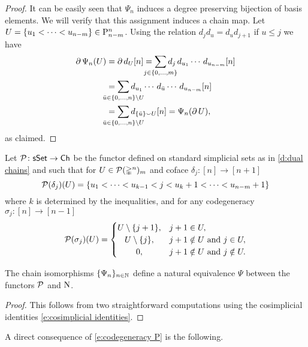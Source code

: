\begin{proof}
	It can be easily seen that $\Psi_n$ induces a degree preserving bijection of basis elements.
	We will verify that this assignment induces a chain map.
	Let $U = \{u_1 < \cdots < u_{n-m}\} \in \mathrm{P}_{n-m}^n$.
	Using the relation $d_jd_u = d_ud_{j+1}$ if $u \leq j$ we have
	\begin{align*}
	\bd \Psi_n(U) &=
	\bd d_U[n] =
	\sum_{\mathclap{j \in \{0, \dots, m\}}}
	d_j\, d_{u_1} \cdots\, d_{u_{n-m}}[n] \\ &=
	\sum_{\mathclap{\bar u \in \{0, \dots, n\} \setminus U}}
	d_{u_1} \cdots\, d_{\bar{u}} \cdots\, d_{u_{n-m}}[n] \\ &=
	\sum_{\mathclap{\bar u \in \{0, \dots, n\} \setminus U}}
	d_{\{\bar u\} \union U}[n] =
	\Psi_n(\bd U),
	\end{align*}
	as claimed.
\end{proof}

\begin{definition}
	Let $\mathcal{P} \colon \mathsf{sSet} \to \mathsf{Ch}$ be the functor defined on standard simplicial sets as in \cref{d:dual chains} and such that for $U \in \mathcal{P}(\mathbb{\Delta}^n)_m$ and coface $\delta_j \colon [n] \to [n+1]$
	\[
	\mathcal{P}(\delta_j)(U) = \{ u_1 < \dots < u_{k-1} < j < u_k+1 < \dots < u_{n-m}+1 \}
	\]
	where $k$ is determined by the inequalities, and for any codegeneracy $\sigma_j \colon [n] \to [n-1]$
	\begin{equation} \label{e:codegeneracy P}
	\cP(\sigma_j)(U) = \begin{cases}
	U \setminus \{j+1\}, & j+1 \in U, \\
	\hfil U \setminus \{j\}, & j+1 \notin U \text{ and } j \in U, \\
	\hfil 0, & j+1 \notin U \text{ and } j \notin U.
	\end{cases}
	\end{equation}
\end{definition}

\begin{lemma} \label{l:P and N}
	The chain isomorphisms $\{\Psi_n\}_{n \in \mathbb{N}}$ define a natural equivalence $\Psi$ between the functors $\mathcal{P}$ and $\operatorname{N}$.
\end{lemma}

\begin{proof}
	This follows from two straightforward computations using the cosimplicial identities \eqref{e:cosimplicial identities}.
\end{proof}

A direct consequence of \cref{e:codegeneracy P} is the following.

